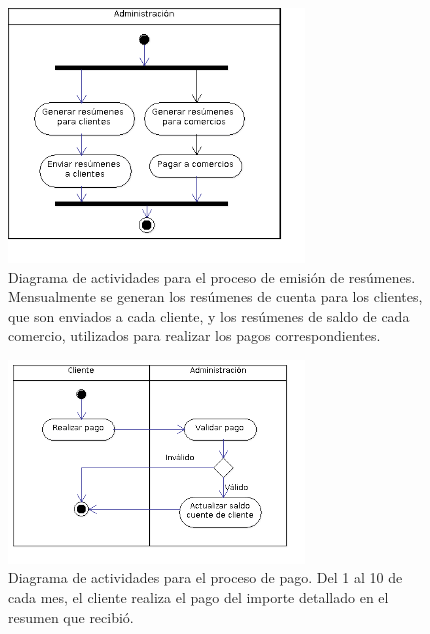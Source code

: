 \begin{figure}[htb]
\begin{center}
\includegraphics[width=0.7\textwidth]{images/mod_negocio_act_resumenes.png}
\end{center}
\caption{Diagrama de actividades para el proceso de emisión de resúmenes. Mensualmente se generan los resúmenes de cuenta para los clientes, que son enviados a cada cliente, y los resúmenes de saldo de cada comercio, utilizados para realizar los pagos correspondientes.}
\end{figure}

\begin{figure}[htb]
\begin{center}
\includegraphics[width=0.7\textwidth]{images/mod_negocio_act_pago.png}
\end{center}
\caption{Diagrama de actividades para el proceso de pago. Del 1 al 10 de cada mes, el cliente realiza el pago del importe detallado en el resumen que recibió.}
\end{figure}

\FloatBarrier
